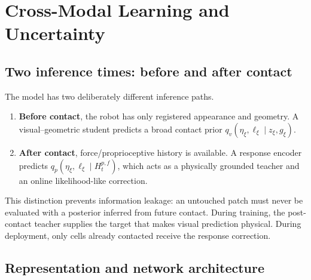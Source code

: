 \section{Cross-Modal Learning and Uncertainty}
\label{sec:learning}

\subsection{Two inference times: before and after contact}

The model has two deliberately different inference paths.

\begin{enumerate}
  \item \textbf{Before contact}, the robot has only registered appearance and geometry. A visual--geometric student predicts a broad contact prior $q_v(\eta_\xi,\ell_\xi\mid z_\xi,g_\xi)$.
  \item \textbf{After contact}, force/proprioceptive history is available. A response encoder predicts $q_p(\eta_\xi,\ell_\xi\mid H^{p,f}_t)$, which acts as a physically grounded teacher and an online likelihood-like correction.
\end{enumerate}

This distinction prevents information leakage: an untouched patch must never be evaluated with a posterior inferred from future contact. During training, the post-contact teacher supplies the target that makes visual prediction physical. During deployment, only cells already contacted receive the response correction.

\subsection{Representation and network architecture}

